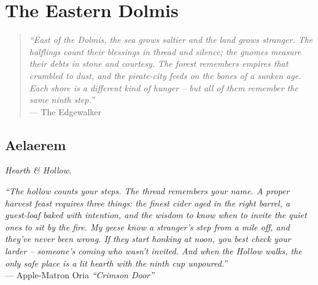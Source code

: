 \documentclass[12pt,oneside]{book}
\begin{document}

\part{The Eastern Dolmis}

\begin{quote}
  \small
  \textit{``East of the Dolmis, the sea grows saltier and the land grows stranger. The halflings count their blessings in thread and silence; the gnomes measure their debts in stone and courtesy. The forest remembers empires that crumbled to dust, and the pirate-city feeds on the bones of a sunken age. Each shore is a different kind of hunger -- but all of them remember the same ninth step.''}
  \\ --- The Edgewalker
\end{quote}

\chapter{Aelaerem}
\emph{Hearth \& Hollow.}

\noindent
\textit{``The hollow counts your steps. The thread remembers your name. A proper harvest feast requires three things: the finest cider aged in the right barrel, a guest-loaf baked with intention, and the wisdom to know when to invite the quiet ones to sit by the fire. My geese know a stranger's step from a mile off, and they've never been wrong. If they start honking at noon, you best check your larder -- someone's coming who wasn't invited. And when the Hollow walks, the only safe place is a lit hearth with the ninth cup unpoured.''} \\
--- Apple-Matron Oria \textit{``Crimson Door''}
\end{document}
